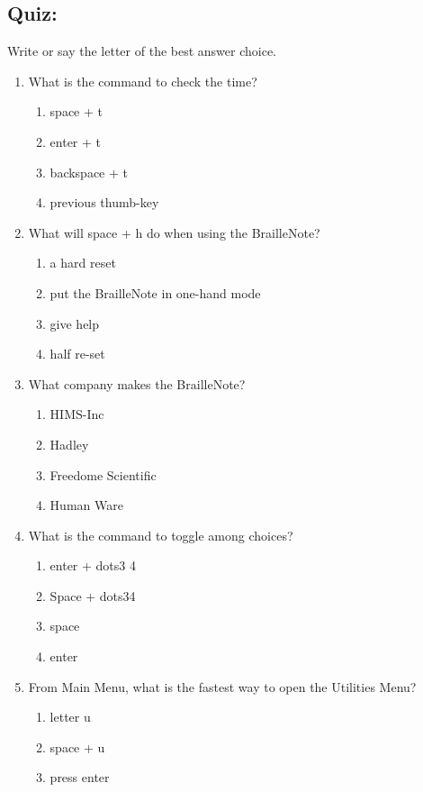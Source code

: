 \documentclass[10pt,letterpaper,twoside]{report}
\begin{document}
\subsection{Quiz:}
Write or say the letter of the best answer choice.
\small{
	\begin{enumerate}
		\item What is the command to check the time?
		      \begin{enumerate}
			      \item space + t
			      \item enter + t
			      \item backspace + t
			      \item previous thumb-key
		      \end{enumerate}
		\item What will space + h do when using the BrailleNote?
		      \begin{enumerate}
			      \item a hard reset
			      \item put the BrailleNote in one-hand mode
			      \item give help
			      \item half re-set
		      \end{enumerate}
		\item What company makes the BrailleNote?
		      \begin{enumerate}
			      \item HIMS-Inc
			      \item Hadley
			      \item Freedome Scientific
			      \item Human Ware
		      \end{enumerate}
		\item What is the command to toggle among choices?
		      \begin{enumerate}
			      \item enter + dots3 4
			      \item Space + dots34
			      \item space
			      \item enter
		      \end{enumerate}
		\item From Main Menu, what is the fastest way to open the Utilities Menu?
		      \begin{enumerate}
			      \item letter u
			      \item space + u
			      \item press enter

\end{enumerate}
\end{enumerate}}
\end{document}

